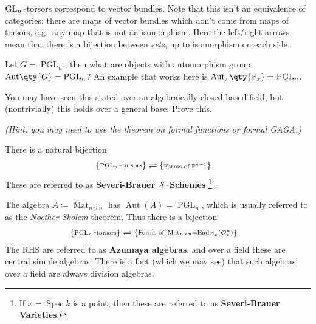 \begin{example}[?]

\(\operatorname{GL}_{n}{\hbox{-}}\)torsors correspond to vector bundles.
Note that this isn't an equivalence of categories: there are maps of
vector bundles which don't come from maps of torsors, e.g.~any map that
is not an isomorphism. Here the left/right arrows mean that there is a
bijection between \emph{sets}, up to isomorphism on each side.

\end{example}

\begin{example}[?]

Let \(G=\operatorname{PGL}_{n}\), then what are objects with
automorphism group
\({\operatorname{Aut}}\qty{G} = \operatorname{PGL}_{n}\)? An example
that works here is
\({\operatorname{Aut}}_{x}\qty{{\mathbb{P}}_{x}} = \operatorname{PGL}_{n}\).

\end{example}

\begin{exercise}[?]

You may have seen this stated over an algebraically closed based field,
but (nontrivially) this holds over a general base. Prove this.

\emph{(Hint: you may need to use the theorem on formal functions or
formal GAGA.)}

\end{exercise}

\begin{corollary}[?]

There is a natural bijection
\begin{align*}
\left\{{\substack{\operatorname{PGL}_{n}{\hbox{-}}\text{torsors}}}\right\}
&\rightleftharpoons
\left\{{\substack{\text{Forms of } {\mathbb{P}}^{n-1}}}\right\}
\end{align*}
These are referred to as \textbf{Severi-Brauer \(X{\hbox{-}}\)Schemes}
\footnote{If \(x = \operatorname{Spec}k\) is a point, then these are
  referred to as \textbf{Severi-Brauer Varieties}.} .

\end{corollary}

\begin{example}[?]

The algebra \(A\coloneqq\operatorname{Mat}_{n\times n}\) has
\({\operatorname{Aut}}(A) = \operatorname{PGL}_{n}\), which is usually
referred to as the \emph{Noether-Skolem} theorem. Thus there is a
bijection
\begin{align*}
\left\{{\substack{\operatorname{PGL}_n{\hbox{-}}\text{torsors}}}\right\}
&\rightleftharpoons
\left\{{\substack{\text{Forms of } \operatorname{Mat}_{n\times n} = \operatorname{End}_{{\mathcal{O}}_{x}} ({\mathcal{O}}_{x}^{n})}}\right\}
\end{align*}
The RHS are referred to as \textbf{Azumaya algebras}, and over a field
these are central simple algebras. There is a fact (which we may see)
that such algebras over a field are always division algebras.

\end{example}

